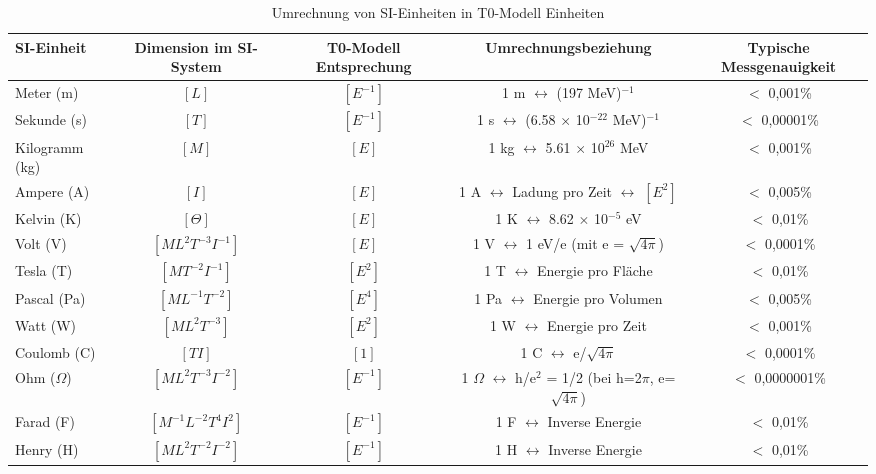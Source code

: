 \documentclass[12pt,a4paper]{article}
\begin{document}
\begin{table}[H]
	\centering
	\begin{adjustbox}{width=\textwidth}
		\begin{tabular}{lcccc}
			\toprule
			\textbf{SI-Einheit} & \textbf{Dimension im SI-System} & \textbf{T0-Modell Entsprechung} & \textbf{Umrechnungsbeziehung} & \textbf{Typische Messgenauigkeit} \\
			\midrule
			Meter (m) & $[L]$ & $[E^{-1}]$ & 1 m $\leftrightarrow$ (197 MeV)$^{-1}$ & $<$ 0,001\% \\
			Sekunde (s) & $[T]$ & $[E^{-1}]$ & 1 s $\leftrightarrow$ (6.58 $\times$ 10$^{-22}$ MeV)$^{-1}$ & $<$ 0,00001\% \\
			Kilogramm (kg) & $[M]$ & $[E]$ & 1 kg $\leftrightarrow$ 5.61 $\times$ 10$^{26}$ MeV & $<$ 0,001\% \\
			Ampere (A) & $[I]$ & $[E]$ & 1 A $\leftrightarrow$ Ladung pro Zeit $\leftrightarrow$ $[E^2]$ & $<$ 0,005\% \\
			Kelvin (K) & $[\Theta]$ & $[E]$ & 1 K $\leftrightarrow$ 8.62 $\times$ 10$^{-5}$ eV & $<$ 0,01\% \\
			Volt (V) & $[ML^2T^{-3}I^{-1}]$ & $[E]$ & 1 V $\leftrightarrow$ 1 eV/e (mit e = $\sqrt{4\pi}$) & $<$ 0,0001\% \\
			Tesla (T) & $[MT^{-2}I^{-1}]$ & $[E^2]$ & 1 T $\leftrightarrow$ Energie pro Fläche & $<$ 0,01\% \\
			Pascal (Pa) & $[ML^{-1}T^{-2}]$ & $[E^4]$ & 1 Pa $\leftrightarrow$ Energie pro Volumen & $<$ 0,005\% \\
			Watt (W) & $[ML^2T^{-3}]$ & $[E^2]$ & 1 W $\leftrightarrow$ Energie pro Zeit & $<$ 0,001\% \\
			Coulomb (C) & $[TI]$ & $[1]$ & 1 C $\leftrightarrow$ e/$\sqrt{4\pi}$ & $<$ 0,0001\% \\
			Ohm ($\Omega$) & $[ML^2T^{-3}I^{-2}]$ & $[E^{-1}]$ & 1 $\Omega$ $\leftrightarrow$ h/e$^2$ = 1/2 (bei h=2$\pi$, e=$\sqrt{4\pi}$) & $<$ 0,0000001\% \\
			Farad (F) & $[M^{-1}L^{-2}T^4I^2]$ & $[E^{-1}]$ & 1 F $\leftrightarrow$ Inverse Energie & $<$ 0,01\% \\
			Henry (H) & $[ML^2T^{-2}I^{-2}]$ & $[E^{-1}]$ & 1 H $\leftrightarrow$ Inverse Energie & $<$ 0,01\% \\
			\bottomrule
		\end{tabular}
	\end{adjustbox}
	\caption{Umrechnung von SI-Einheiten in T0-Modell Einheiten}
	\label{tab:umrechnung}
\end{table}
\end{document}

